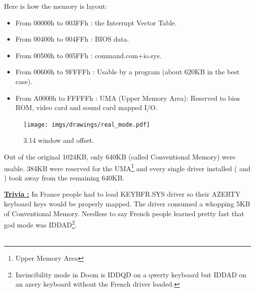 \documentclass[book.tex]{subfiles}
\begin{document}
  \bigskip
Here is how the memory is layout: \\
\begin{itemize}
\item From 00000h to 003FFh : the Interrupt Vector Table.
\item From 00400h to 004FFh : BIOS data.
\item From 00500h to 005FFh : command.com+io.sys.
\item From 00600h to 9FFFFh : Usable by a program (about 620KB in the best case). 
\item From A0000h to FFFFFh : UMA (Upper Memory Area): Reserved to bios ROM, video card and sound card mapped I/O.
\end{itemize}

\begin{figure}[H]
\centering
\texttt{[image: imgs/drawings/real\_mode.pdf]}

\caption{3.14 window and offset.}
\label{fig:fp_internals}
\end{figure}


Out of the original 1024KB, only 640KB (called Conventional Memory) were usable. 384KB were reserved for the UMA\footnote{Upper Memory Area} and every single driver installed ( and )  took away from the remaining 640KB.

\bigskip

\textbf{\underline{Trivia :}}  In France people had to load KEYBFR.SYS driver so their AZERTY keyboard keys would be properly mapped. The driver consumed a whopping 5KB of Conventional Memory. Needless to say French people learned pretty fast that god mode was IDDAD\footnote{Invincibility mode in Doom is IDDQD on a qwerty keyboard but IDDAD on an azery keyboard without the French driver loaded.}.\\
\\
\end{document}
